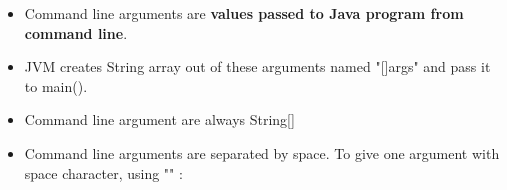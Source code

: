 

\begin{flushleft}
	
	\begin{itemize}
			\item Command line arguments are \textbf{values passed to Java program from command line}. 
			\item JVM creates String array out of these arguments named "[]args" and pass it to main().
			
		
		
			\item Command line argument are always String[]
			
			\bigskip
			\bigskip
			\item Command line arguments are separated by space. To give one argument with space character, using "" :
	\end{itemize}

\end{flushleft}


